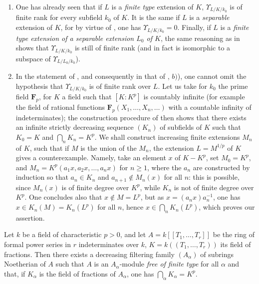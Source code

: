 \begin{remarks}[21.8.7]
\label{0.21.8.7}
\begin{enumerate}
  \item[(i)] One has already seen  that if $L$ is a \emph{finite type} extension of $K$, $\Upsilon_{L/K/k_0}$ is of finite rank for every subfield $k_0$ of $K$.
    It is the same if $L$ is a \emph{separable} extension of $K$, for by virtue of , one has $\Upsilon_{L/K/k_0}=0$.
    Finally, if $L$ is a \emph{finite type extension of a separable extension $L_0$ of $K$}, the same reasoning as in  shows that $\Upsilon_{L/K/k_0}$ is still of finite rank (and in fact is isomorphic to a subspace of $\Upsilon_{L/L_0/k_0}$).
  \item[(ii)] In the statement of , and consequently in that of , $b)$), one cannot omit the hypothesis that $\Upsilon_{L/K/k_0}$ is of finite rank over $L$.
    Let us take for $k_0$ the prime field $\mathbf{F}_p$, for $K$ a field such that $[K:K^p]$ is countably infinite (for example the field of rational functions $\mathbf{F}_p(X_1,\ldots,X_n,\ldots)$ with a countable infinity of indeterminates);
    the construction procedure of  then shows that there exists an infinite strictly decreasing sequence $(K_n)$ of subfields of $K$ such that $K_0=K$ and $\bigcap_n K_n=K^p$.
    We shall construct increasing finite extensions $M_n$ of $K$, such that if $M$ is the union of the $M_n$, the extension $L=M^{1/p}$ of $K$ gives  a counterexample.
    Namely, take an element $x$ of $K-K^p$, set $M_0=K^p$, and $M_n=K^p(a_1 x,a_2 x,\ldots,a_n x)$ for $n\geqslant 1$, where the $a_n$ are constructed by induction so that $a_n\in K_n$ and $a_{n+1}\notin M_n(x)$ for all $n$: this is possible, since $M_n(x)$ is of finite degree over $K^p$, while $K_n$ is not of finite degree over $K^p$.
    One concludes also that $x\notin M=L^p$, but as $x=(a_n x)a_n^{-1}$, one has $x\in K_n(M)=K_n(L^p)$ for all $n$, hence $x\in\bigcap_n K_n(L^p)$, which proves our assertion.
\end{enumerate}
\end{remarks}

\begin{proposition}[21.8.8]
\label{0.21.8.8}
Let $k$ be a field of characteristic $p>0$, and let $A=k[[T_1,\ldots,T_r]]$ be the ring of formal power series in $r$ indeterminates over $k$, $K=k((T_1,\ldots,T_r))$ its field of fractions.
Then there exists a decreasing filtering family $(A_\alpha)$ of subrings Noetherian of $A$ such that $A$ is an $A_\alpha$-module \emph{free of finite type} for all $\alpha$ and that, if $K_\alpha$ is the field of fractions of $A_\alpha$, one has $\bigcap_\alpha K_\alpha=K^p$.
\end{proposition}

